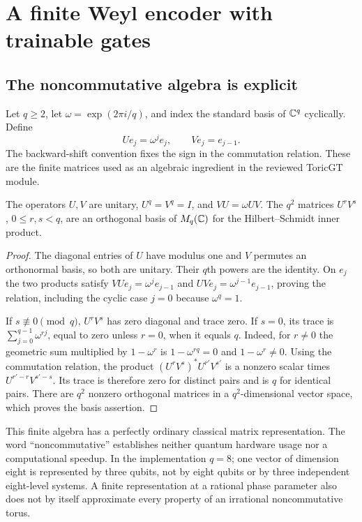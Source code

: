 \section{A finite Weyl encoder with trainable gates}

\subsection{The noncommutative algebra is explicit}

Let $q\geq2$, let $\omega=\exp(2\pi i/q)$, and index the standard basis of
$\mathbb{C}^q$ cyclically. Define
\[
 Ue_j=\omega^j e_j,\qquad Ve_j=e_{j-1}.
\]
The backward-shift convention fixes the sign in the commutation relation.
These are the finite matrices used as an algebraic ingredient in the
reviewed ToricGT module.\cite{qtWeylCode}

\begin{proposition}
\label{qt:weyl}
The operators $U,V$ are unitary, $U^q=V^q=I$, and $VU=\omega UV$.
The $q^2$ matrices $U^rV^s$, $0\leq r,s<q$, are an orthogonal basis of
$M_q(\mathbb{C})$ for the Hilbert--Schmidt inner product.
\end{proposition}
\begin{proof}
The diagonal entries of $U$ have modulus one and $V$ permutes an
orthonormal basis, so both are unitary. Their $q$th powers are the identity.
On $e_j$ the two products satisfy
$VUe_j=\omega^j e_{j-1}$ and $UVe_j=\omega^{j-1}e_{j-1}$, proving the
relation, including the cyclic case $j=0$ because $\omega^q=1$.

If $s\not\equiv0\pmod q$, $U^rV^s$ has zero diagonal and trace zero.
If $s=0$, its trace is $\sum_{j=0}^{q-1}\omega^{rj}$, equal to zero unless
$r=0$, when it equals $q$. Indeed, for $r\neq0$ the geometric sum multiplied
by $1-\omega^r$ is $1-\omega^{rq}=0$ and $1-\omega^r\neq0$.
Using the commutation relation, the product
$(U^rV^s)^*U^{r'}V^{s'}$ is a nonzero scalar times
$U^{r'-r}V^{s'-s}$. Its trace is therefore zero for distinct pairs and is
$q$ for identical pairs. There are $q^2$ nonzero orthogonal matrices in a
$q^2$-dimensional vector space, which proves the basis assertion.
\end{proof}

This finite algebra has a perfectly ordinary classical matrix
representation. The word ``noncommutative'' establishes neither quantum
hardware usage nor a computational speedup. In the implementation $q=8$;
one vector of dimension eight is represented by three qubits, not by eight
qubits or by three independent eight-level systems. A finite representation
at a rational phase parameter also does not by itself approximate every property of an
irrational noncommutative torus.

